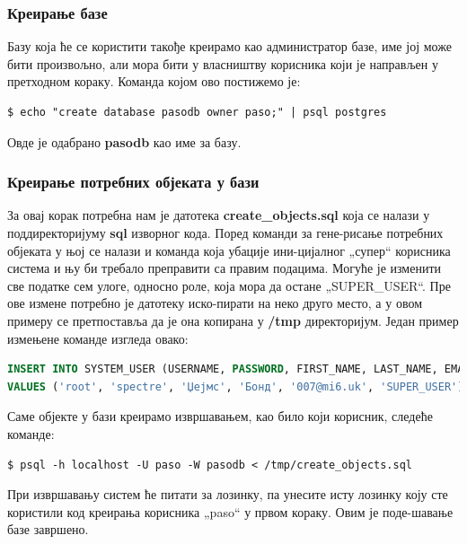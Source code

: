 \documentclass[a4paper, 12pt, diplomski]{etfcyr}
\def\quote#1{„#1“}
\begin{document}
					\subsubsection*{Креирање базе}
						\begin{justify}
							Базу која ће се користити такође креирамо као администратор базе, име јој може бити произвољно, али мора бити у власништву корисника који је направљен у претходном кораку. Команда којом ово постижемо је:
							\begin{footnotesize}
								\begin{verbatim}
$ echo "create database pasodb owner paso;" | psql postgres
								\end{verbatim}
							\end{footnotesize}
							Овде је одабрано \textbf{pasodb} као име за базу.
						\end{justify}

					\subsubsection*{Креирање потребних објеката у бази}
						\begin{justify}
							За овај корак потребна нам је датотека \textbf{create\_objects.sql} која се налази у поддиректоријуму \textbf{sql} изворног кода. Поред команди за гене-рисање потребних објеката у њој се налази и команда која убације ини-цијалног \quote{супер} корисника система и њу би требало преправити са правим подацима. Могуће је изменити све податке сем улоге, односно роле, која мора да остане \quote{SUPER\_USER}. Пре ове измене потребно је датотеку иско-пирати на неко друго место, а у овом примеру се претпоставља да је она копирана у \textbf{/tmp} директоријум. Један пример измењене команде изгледа овако:
							\begin{lstlisting}[language=SQL,basicstyle=\scriptsize\ttfamily,frame=none]
INSERT INTO SYSTEM_USER (USERNAME, PASSWORD, FIRST_NAME, LAST_NAME, EMAIL, ROLE)
VALUES ('root', 'spectre', 'Џејмс', 'Бонд', '007@mi6.uk', 'SUPER_USER');
							\end{lstlisting}
							Саме објекте у бази креирамо извршавањем, као било који корисник, следеће команде:
							\begin{footnotesize}
								\begin{verbatim}
$ psql -h localhost -U paso -W pasodb < /tmp/create_objects.sql
								\end{verbatim}
							\end{footnotesize}
							При извршавању систем ће питати за лозинку, па унесите исту лозинку коју сте користили код креирања корисника \quote{paso} у првом кораку. Овим је поде-шавање базе завршено.
						\end{justify}
\end{document}
